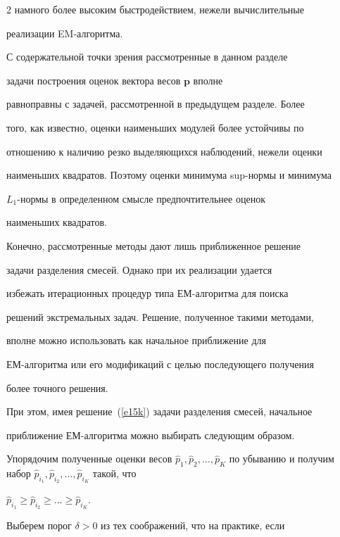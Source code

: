 \begin{multicols}{2}
намного более высоким быстродействием, нежели вычислительные


реализации EM-алгоритма.





С содержательной точки зрения рассмотренные в данном разделе


задачи построения оценок вектора весов $\mathbf p$ вполне


равноправны с задачей, рассмотренной в предыдущем разделе. Более


того, как известно, оценки наименьших модулей более устойчивы по


отношению к наличию резко выделяющихся наблюдений, нежели оценки


наименьших квадратов. Поэтому оценки минимума sup-нормы и минимума


$L_1$-нормы в определенном смысле предпочтительнее оценок


наименьших квадратов.





Конечно, рассмотренные методы дают лишь приближенное решение


задачи разделения смесей. Однако при их реализации удается


избежать итерационных процедур типа ЕМ-алгоритма для поиска


решений экстремальных задач. Решение, полученное такими методами,


вполне можно использовать как начальное приближение для


ЕМ-алгоритма или его модификаций с целью последующего получения


более точного решения.





При этом, имея решение~(\ref{e15k}) задачи разделения смесей, начальное


приближение ЕМ-алгоритма можно выбирать следующим образом.


Упорядочим полученные оценки весов $\widehat p_1, \widehat


p_2,\ldots,\widehat p_K$ по убыванию и получим набор $\widehat


p_{i_1}, \widehat p_{i_2},\ldots,\widehat p_{i_K}$ такой, что


$\widehat p_{i_1}\ge\widehat p_{i_2}\ge\ldots\ge\widehat p_{i_K}$.


Выберем порог $\delta>0$ из тех соображений, что на практике, если



\end{multicols}
